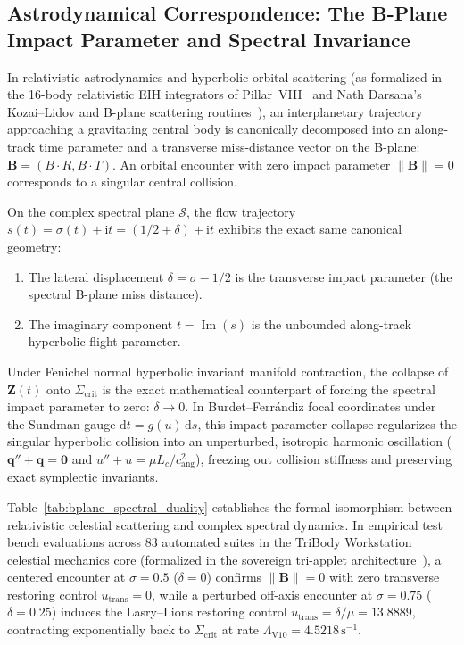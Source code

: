 \documentclass[11pt,a4paper,reqno]{article}
\theoremstyle{plain}
\theoremstyle{definition}
\theoremstyle{remark}
\numberwithin{equation}{section}
\providecommand{\diff}{\mathrm{d}}
\begin{document}
\subsection{Astrodynamical Correspondence: The B-Plane Impact Parameter and Spectral Invariance}
\label{subsec:bplane_analogy}

In relativistic astrodynamics and hyperbolic orbital scattering (as formalized in the 16-body relativistic EIH integrators of Pillar~VIII~\cite{PillarVIIIMonograph2026} and Nath Darsana's Kozai--Lidov and B-plane scattering routines~\cite{NathDarsanaV2Monograph2026}), an interplanetary trajectory approaching a gravitating central body is canonically decomposed into an along-track time parameter and a transverse miss-distance vector on the B-plane: $\bm{B} = (B \cdot R, B \cdot T)$. An orbital encounter with zero impact parameter $\|\bm{B}\| = 0$ corresponds to a singular central collision.

On the complex spectral plane $\mathcal{S}$, the flow trajectory $s(t) = \sigma(t) + \mathrm{i}t = (1/2 + \delta) + \mathrm{i}t$ exhibits the exact same canonical geometry:
\begin{enumerate}[label=\textbf{(\roman*)}, leftmargin=2.2em]
  \item The lateral displacement $\delta = \sigma - 1/2$ is the transverse impact parameter (the spectral B-plane miss distance).
  \item The imaginary component $t = \operatorname{Im}(s)$ is the unbounded along-track hyperbolic flight parameter.
\end{enumerate}
Under Fenichel normal hyperbolic invariant manifold contraction, the collapse of $\bm{Z}(t)$ onto $\Sigma_{\mathrm{crit}}$ is the exact mathematical counterpart of forcing the spectral impact parameter to zero: $\delta \to 0$. In Burdet--Ferr\'{a}ndiz focal coordinates under the Sundman gauge $\diff t = g(u)\,\diff s$, this impact-parameter collapse regularizes the singular hyperbolic collision into an unperturbed, isotropic harmonic oscillation ($\bm{q}'' + \bm{q} = \bm{0}$ and $u'' + u = \mu L_c / c_{\mathrm{ang}}^2$), freezing out collision stiffness and preserving exact symplectic invariants.

Table~\ref{tab:bplane_spectral_duality} establishes the formal isomorphism between relativistic celestial scattering and complex spectral dynamics. In empirical test bench evaluations across $83$ automated suites in the TriBody Workstation celestial mechanics core (formalized in the sovereign tri-applet architecture~\cite{PillarXMonograph2026}), a centered encounter at $\sigma = 0.5$ ($\delta = 0$) confirms $\|\bm{B}\| = 0$ with zero transverse restoring control $u_{\mathrm{trans}} = 0$, while a perturbed off-axis encounter at $\sigma = 0.75$ ($\delta = 0.25$) induces the Lasry--Lions restoring control $u_{\mathrm{trans}} = \delta/\mu = 13.8889$, contracting exponentially back to $\Sigma_{\mathrm{crit}}$ at rate $\Lambda_{\mathrm{V10}} = 4.5218\,\mathrm{s}^{-1}$.
\end{document}
